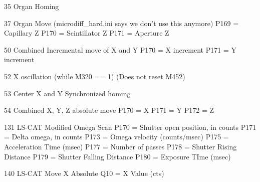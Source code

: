 \begin{DoxyPre} 35             Organ Homing\end{DoxyPre}



\begin{DoxyPre} 37             Organ Move   (microdiff\_hard.ini says we don't use this anymore)
                        P169  = Capillary Z
                        P170  = Scintillator Z
                        P171  = Aperture Z\end{DoxyPre}



\begin{DoxyPre} 50             Combined Incremental move of X and Y
                        P170  = X increment
                        P171  = Y increment\end{DoxyPre}



\begin{DoxyPre} 52             X oscillation (while M320 == 1)
                        (Does not reset M452)\end{DoxyPre}



\begin{DoxyPre} 53             Center X and Y Synchronized homing\end{DoxyPre}



\begin{DoxyPre} 54             Combined X, Y, Z absolute move
                        P170  = X
                        P171  = Y
                        P172  = Z\end{DoxyPre}



\begin{DoxyPre}131             LS-CAT Modified Omega Scan
                        P170    = Shutter open position, in counts
                        P171    = Delta omega, in counts
                        P173    = Omega velocity (counts/msec)
                        P175    = Acceleration Time (msec)
                        P177    = Number of passes
                        P178    = Shutter Rising Distance
                        P179    = Shutter Falling Distance
                        P180    = Exposure TIme (msec)\end{DoxyPre}



\begin{DoxyPre}140             LS-CAT Move X Absolute
                        Q10    = X Value (cts)\end{DoxyPre}



